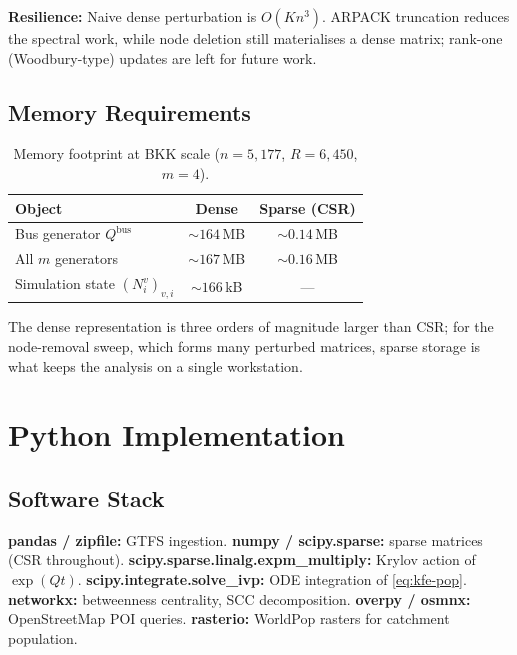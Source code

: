 \documentclass[12pt,a4paper]{article}
\theoremstyle{plain}
\theoremstyle{definition}
\theoremstyle{remark}
\begin{document}
\textbf{Resilience:} Naive dense perturbation is $O(Kn^3)$.  ARPACK
truncation reduces the spectral work, while node deletion still materialises a
dense matrix; rank-one (Woodbury-type) updates \citep{hunter2014} are left for
future work.

\subsection{Memory Requirements}

\begin{table}[htbp]
\centering
\small
\begin{tabular}{lcc}
\toprule
Object & Dense & Sparse (CSR) \\
\midrule
Bus generator $Q^{\mathrm{bus}}$ & $\sim164$\,MB & $\sim0.14$\,MB \\
All $m$ generators                & $\sim167$\,MB & $\sim0.16$\,MB \\
Simulation state $(N^v_i)_{v,i}$  & $\sim166$\,kB & --- \\
\bottomrule
\end{tabular}
\caption{Memory footprint at BKK scale ($n=5{,}177$, $R=6{,}450$, $m=4$).}
\end{table}

The dense representation is three orders of magnitude larger than CSR; for
the node-removal sweep, which forms many perturbed matrices, sparse storage is
what keeps the analysis on a single workstation.

\section{Python Implementation}
\label{sec:impl}

\subsection{Software Stack}

\textbf{pandas / zipfile:} GTFS ingestion.\quad
\textbf{numpy / scipy.sparse:} sparse matrices (CSR throughout).\quad
\textbf{scipy.sparse.linalg.expm\_multiply:} Krylov action of $\exp(Qt)$.\quad
\textbf{scipy.integrate.solve\_ivp:} ODE integration of \eqref{eq:kfe-pop}.\quad
\textbf{networkx:} betweenness centrality, SCC decomposition.\quad
\textbf{overpy / osmnx:} OpenStreetMap POI queries.\quad
\textbf{rasterio:} WorldPop rasters for catchment population.
\end{document}
